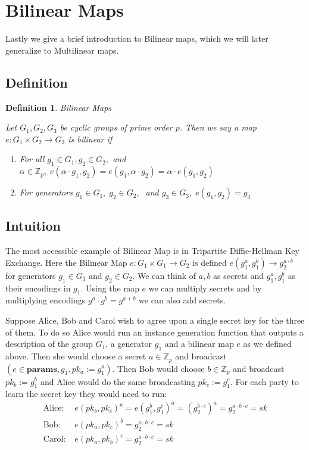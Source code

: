 \documentclass[12pt,twoside]{reedthesis}
\newtheorem{definition}{Definition}
\newcommand{\Z}[0]{\mathbb{Z}}
\begin{document}
    
    \section{Bilinear Maps}
    
    Lastly we give a brief introduction to Bilinear maps, which we will later generalize to Multilinear maps.
    
    \subsection{Definition}
    
    \begin{definition}{Bilinear Maps}
    \par Let $G_1,G_2,G_3$ be cyclic groups of prime order $p$. Then we say a map $e:G_1 \times G_2 \rightarrow G_3$ is bilinear if
    
    \begin{enumerate}
    \item For all $g_1 \in G_1, g_2\in G_2,$ and $ \alpha \in \Z_p, \; e(\alpha\cdot g_1,g_2) =e( g_1,\alpha\cdot g_2) = \alpha\cdot e(g_1,g_2) $
    \item For generators $g_1\in G_1, \; g_2 \in G_2, \;$ and $g_3 \in G_3,\; e(g_1,g_2) = g_3$     \end{enumerate}    
    \end{definition}
    
    \subsection{Intuition}
    \newcommand{\params}[0]{\textbf{params}}
    The most accessible example of Bilinear Map is in Tripartite Diffie-Hellman Key Exchange. Here the Bilinear Map $e:G_1 \times G_1 \rightarrow G_2$ is defined $e(g_1^a,g_1^b) \rightarrow g_2^{a\cdot b}$ for generators $g_1\in G_1$ and $g_2 \in G_2$. We can think of $a,b$ as secrets and $g_1^a,g_1^b$ as their encodings in $g_1$. Using the map $e$ we can multiply secrets and by multiplying encodings $g^a\cdot g^b = g^{a+b}$ we can also add secrets. 
\par Suppose Alice, Bob and Carol wish to agree upon a single secret key for the three of them. To do so Alice would run an instance generation function that outputs a description of the group $G_1$, a generator $g_1$ and a bilinear map $e$ as we defined above. Then she would choose a secret $a \in \Z_p$ and broadcast $(e \in \params, g_1, pk_a := g_1^a)$. Then Bob would choose $b\in \Z_p$ and broadcast $pk_b := g_1^b$ and Alice would do the same broadcasting $pk_c := g_1^c$. For each party to learn the secret key they would need to run:
\begin{align*}
\text{Alice:} & \; e(pk_b,pk_c)^a = e(g_1^b,g_1^c)^a = ( g_2^{b\cdot c} )^a = g_2^{a\cdot b \cdot c} = sk\\
\text{Bob:} &\; e(pk_a,pk_c)^b = g_2^{a \cdot b \cdot c} = sk \\
\text{Carol:}& \; e(pk_a,pk_b)^c = g_2^{a \cdot b \cdot c} = sk
\end{align*}
\end{document}
